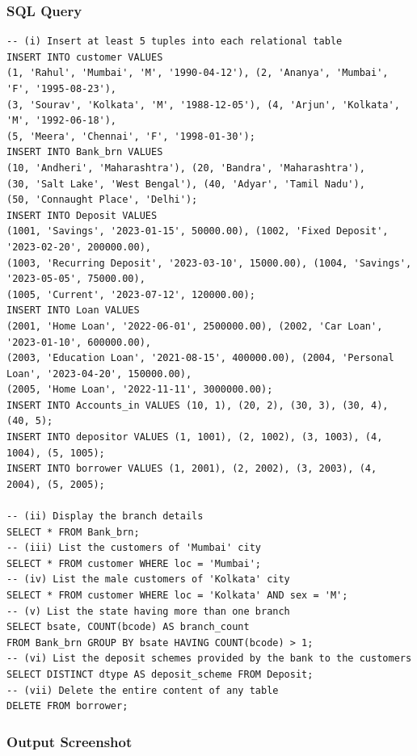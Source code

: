 \subsubsection*{SQL Query}
\begin{lstlisting}[basicstyle=\ttfamily\footnotesize,caption={Populating records, conditional filtering, grouped aggregations, and deletion}]
-- (i) Insert at least 5 tuples into each relational table
INSERT INTO customer VALUES
(1, 'Rahul', 'Mumbai', 'M', '1990-04-12'), (2, 'Ananya', 'Mumbai', 'F', '1995-08-23'),
(3, 'Sourav', 'Kolkata', 'M', '1988-12-05'), (4, 'Arjun', 'Kolkata', 'M', '1992-06-18'),
(5, 'Meera', 'Chennai', 'F', '1998-01-30');
INSERT INTO Bank_brn VALUES
(10, 'Andheri', 'Maharashtra'), (20, 'Bandra', 'Maharashtra'),
(30, 'Salt Lake', 'West Bengal'), (40, 'Adyar', 'Tamil Nadu'),
(50, 'Connaught Place', 'Delhi');
INSERT INTO Deposit VALUES
(1001, 'Savings', '2023-01-15', 50000.00), (1002, 'Fixed Deposit', '2023-02-20', 200000.00),
(1003, 'Recurring Deposit', '2023-03-10', 15000.00), (1004, 'Savings', '2023-05-05', 75000.00),
(1005, 'Current', '2023-07-12', 120000.00);
INSERT INTO Loan VALUES
(2001, 'Home Loan', '2022-06-01', 2500000.00), (2002, 'Car Loan', '2023-01-10', 600000.00),
(2003, 'Education Loan', '2021-08-15', 400000.00), (2004, 'Personal Loan', '2023-04-20', 150000.00),
(2005, 'Home Loan', '2022-11-11', 3000000.00);
INSERT INTO Accounts_in VALUES (10, 1), (20, 2), (30, 3), (30, 4), (40, 5);
INSERT INTO depositor VALUES (1, 1001), (2, 1002), (3, 1003), (4, 1004), (5, 1005);
INSERT INTO borrower VALUES (1, 2001), (2, 2002), (3, 2003), (4, 2004), (5, 2005);

-- (ii) Display the branch details
SELECT * FROM Bank_brn;
-- (iii) List the customers of 'Mumbai' city
SELECT * FROM customer WHERE loc = 'Mumbai';
-- (iv) List the male customers of 'Kolkata' city
SELECT * FROM customer WHERE loc = 'Kolkata' AND sex = 'M';
-- (v) List the state having more than one branch
SELECT bsate, COUNT(bcode) AS branch_count
FROM Bank_brn GROUP BY bsate HAVING COUNT(bcode) > 1;
-- (vi) List the deposit schemes provided by the bank to the customers
SELECT DISTINCT dtype AS deposit_scheme FROM Deposit;
-- (vii) Delete the entire content of any table
DELETE FROM borrower;
\end{lstlisting}

\newpage

\subsubsection*{Output Screenshot}

